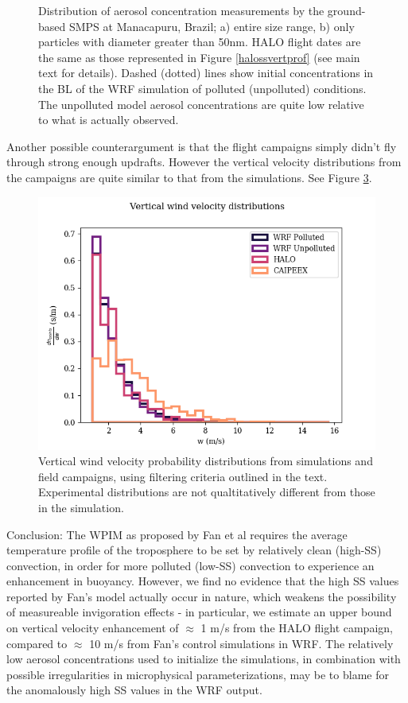 \documentclass{article}
\begin{document}
\begin{figure}[ht]
\begin{subfigure}{0.7\textwidth}
		\label{goamazonuap50hist}
		\caption{}
	\end{subfigure}
	\caption{Distribution of aerosol concentration measurements by the ground-based SMPS at Manacapuru, Brazil; a) entire size range, b) only particles with diameter greater than 50nm. HALO flight dates are the same as those represented in Figure \ref{halossvertprof} (see main text for details). Dashed (dotted) lines show initial concentrations in the BL of the WRF simulation of polluted (unpolluted) conditions. The unpolluted model aerosol concentrations are quite low relative to what is actually observed.}
	\label{goamazonhist}
\end{figure}

Another possible counterargument is that the flight campaigns simply didn't fly through strong enough updrafts. However the vertical velocity distributions from the campaigns are quite similar to that from the simulations. See Figure \ref{combinedwhist}. 

\begin{figure}[ht]
    \centering
    \includegraphics[width=12cm]{wrf/combined_w_hist_figure.png}
    \caption{Vertical wind velocity probability distributions from simulations and field campaigns, using filtering criteria outlined in the text. Experimental distributions are not qualtitatively different from those in the simulation.}
    \label{combinedwhist}
\end{figure}

Conclusion: The WPIM as proposed by Fan et al requires the average temperature profile of the troposphere to be set by relatively clean (high-SS) convection, in order for more polluted (low-SS) convection to experience an enhancement in buoyancy. However, we find no evidence that the high SS values reported by Fan's model actually occur in nature, which weakens the possibility of measureable invigoration effects - in particular, we estimate an upper bound on vertical velocity enhancement of $\approx$ 1 m/s from the HALO flight campaign, compared to $\approx$ 10 m/s from Fan's control simulations in WRF. The relatively low aerosol concentrations used to initialize the simulations, in combination with possible irregularities in microphysical parameterizations, may be to blame for the anomalously high SS values in the WRF output.
\end{document}
